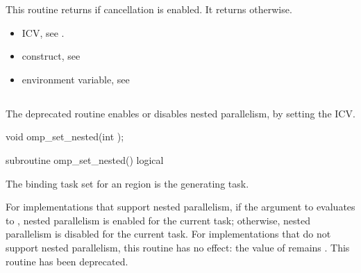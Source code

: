 \effect
This routine returns  if cancellation is enabled. It returns  otherwise.

\crossreferences
\begin{itemize}
\item {} ICV, see 
.

\item {} construct, see 

\item {} environment variable, see 
\end{itemize}









\subsection{}
\label{subsec:omp_set_nested}
\summary
The deprecated  routine enables or disables nested parallelism, by setting the 
 ICV. 

\newpage %
\format
\begin{ccppspecific}
\begin{ompcFunction}
void omp_set_nested(int );
\end{ompcFunction}
\end{ccppspecific}

\begin{fortranspecific}
\begin{ompfSubroutine}
subroutine omp_set_nested()
logical 
\end{ompfSubroutine}
\end{fortranspecific}

\binding
The binding task set for an  region is the generating task. 

\effect
For implementations that support nested parallelism, if the argument to 
 evaluates to , nested parallelism is enabled for the current task; 
otherwise, nested parallelism is disabled for the current task. For implementations that 
do not support nested parallelism, this routine has no effect: the value of  
remains . This routine has been deprecated.

